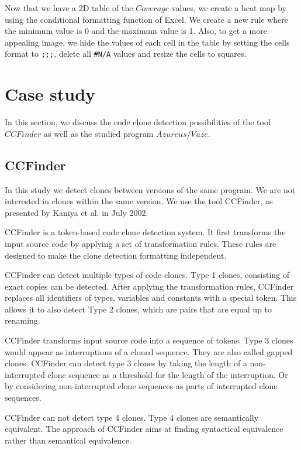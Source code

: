 \documentclass[a4paper,twoside, twocolumn, 11pt]{article}
\numberwithin{equation}{section}
\begin{document}
Now that we have a 2D table of the $Coverage$ values, we create a heat map by using the conditional formatting function of Excel.
We create a new rule where the minimum value is 0 and the maximum value is 1.
Also, to get a more appealing image, we hide the values of each cell in the table by setting the cells format to \texttt{;;;}, delete all \texttt{\#N/A} values and resize the cells to squares.

\section{Case study}
In this section, we discuss the code clone detection possibilities of the tool $CCFinder$ as well as the studied program $Azureus/Vuze$.

\subsection{CCFinder}
In this study we detect clones between versions of the same program.
We are not interested in clones within the same version.
We use the tool CCFinder, as presented by Kaniya et al. in July 2002.

CCFinder is a token-based code clone detection system. \cite{CCFinder}
It first transforms the input source code by applying a set of transformation rules.
These rules are designed to make the clone detection formatting independent.  

CCFinder can detect multiple types of code clones.
Type 1 clones, consisting of exact copies can be detected. 
After applying the transformation rules, CCFinder replaces all identifiers of types, variables and constants with a special token.
This allows it to also detect Type 2 clones, which are pairs that are equal up to renaming.

CCFinder transforms input source code into a sequence of tokens.
Type 3 clones would appear as interruptions of a cloned sequence. They are also called gapped clones.
CCFinder can detect type 3 clones by taking the length of a non-interrupted clone sequence as a threshold for the length of the interruption.
Or by considering non-interrupted clone sequences as parts of interrupted clone sequences.

CCFinder can not detect type 4 clones.
Type 4 clones are semantically equivalent. 
The approach of CCFinder aims at finding syntactical equivalence rather than semantical equivalence.
\end{document}

